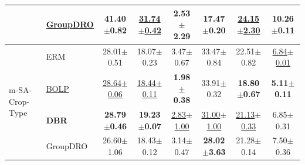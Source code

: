 \documentclass[10pt,twocolumn,letterpaper]{article}
\begin{document}
\begin{table}[t]
{\begin{tabular}{llcccccc}
 & \underline{GroupDRO} & 41.40$\pm$0.82 & \underline{31.74$\pm$0.42} & 2.53$\pm$2.29 & \textbf{17.47$\pm$0.20} & \underline{24.15$\pm$2.30} & 10.26$\pm$0.11 \\
\midrule
\multirow{4}{*}{m-SA-Crop-Type} 
 & ERM & 28.01$\pm$0.51 & 18.07$\pm$0.23 & 3.47$\pm$0.67 & 33.47$\pm$0.84 & 22.51$\pm$0.82 & \underline{6.84$\pm$0.01} \\
 & \underline{BOLP} & \underline{28.64$\pm$0.06} & \underline{18.44$\pm$0.11} & \textbf{1.98$\pm$0.38} & 33.91$\pm$0.32 & \textbf{18.80$\pm$0.67} & \textbf{5.11$\pm$0.11} \\
 & \textbf{DBR} & \textbf{28.79$\pm$0.46} & \textbf{19.23$\pm$0.07} & \underline{2.83$\pm$1.00} & \underline{31.00$\pm$1.00} & \underline{21.13$\pm$0.33} & 6.85$\pm$0.31 \\
 & GroupDRO & 26.60$\pm$1.06 & 18.43$\pm$0.12 & 3.14$\pm$0.47 & \textbf{28.02$\pm$3.63} & 21.28$\pm$0.14 & 7.50$\pm$0.36 \\
\bottomrule
\end{tabular}
}

\vspace{0.4em}


\end{table}
\end{document}
